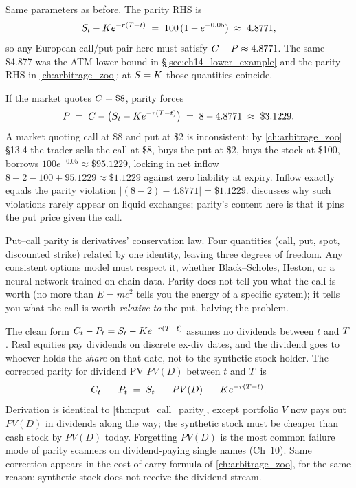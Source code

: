 Same parameters as before. The parity RHS is
\begin{equation*}
  S_t - K e^{-r(T - t)}
    \;=\; 100\,(1 - e^{-0.05})
    \;\approx\; 4.8771,
\end{equation*}
so any European call/put pair here must satisfy
$C - P \approx 4.8771$. The same \$4.877 was the ATM
lower bound in \S\ref{sec:ch14_lower_example} and the parity
RHS in \cref{ch:arbitrage_zoo}: at $S = K$ those
quantities coincide.

If the market quotes $C = \$8$, parity forces
\begin{equation*}
  P \;=\; C - \bigl(S_t - K e^{-r(T - t)}\bigr)
       \;=\; 8 - 4.8771
       \;\approx\; \$3.1229.
\end{equation*}
A market quoting call at \$8 and put at \$2 is inconsistent: by
\cref{ch:arbitrage_zoo} \S13.4 the trader sells the call at \$8,
buys the put at \$2, buys the stock at \$100, borrows
$100 e^{-0.05} \approx \$95.1229$, locking in net inflow
$8 - 2 - 100 + 95.1229 \approx \$1.1229$ against zero liability
at expiry. Inflow exactly equals the parity violation
$|(8-2) - 4.8771| = \$1.1229$.  discusses
why such violations rarely appear on liquid exchanges; parity's
content here is that it pins the put price given the call.

\begin{intuitionbox}
Put--call parity is derivatives' conservation law. Four
quantities (call, put, spot, discounted strike) related by one
identity, leaving three degrees of freedom. Any consistent
options model must respect it, whether Black--Scholes, Heston,
or a neural network trained on chain data. Parity does not tell you
what the call is worth (no more than $E = mc^2$ tells you the
energy of a specific system); it tells you what the call is
worth \emph{relative to} the put, halving the problem.
\end{intuitionbox}

\begin{pitfallbox}
\label{pf:parity_dividends_ch14}
The clean form $C_t - P_t = S_t - K e^{-r(T-t)}$
assumes no dividends between $t$ and $T$. Real equities pay
dividends on discrete ex-div dates, and the dividend goes to
whoever holds the \emph{share} on that date, not to the
synthetic-stock holder. The corrected parity for dividend PV
$PV(D)$ between $t$ and $T$ is
\begin{equation}
  C_t \;-\; P_t \;=\; S_t \;-\; PV(D) \;-\; K e^{-r(T - t)}.
  \label{eq:parity_dividends}
\end{equation}
Derivation is identical to \cref{thm:put_call_parity}, except
portfolio $V$ now pays out $PV(D)$ in dividends along the way;
the synthetic stock must be cheaper than cash stock by $PV(D)$
today. Forgetting $PV(D)$ is the most common failure mode of
parity scanners on dividend-paying single names \citeHull{}
(Ch~$10$). Same correction appears in the cost-of-carry formula
of \cref{ch:arbitrage_zoo}, for the same reason: synthetic stock
does not receive the dividend stream.
\end{pitfallbox}

